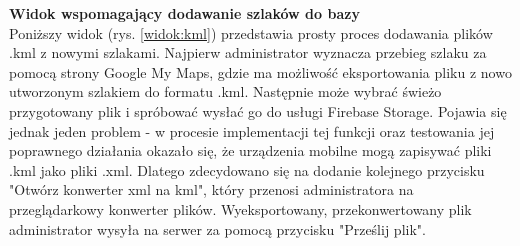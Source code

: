 \textbf{Widok wspomagający dodawanie szlaków do bazy} \\ 
\indent Poniższy widok (rys. \ref{widok:kml}) przedstawia prosty proces dodawania plików .kml z nowymi szlakami. Najpierw administrator wyznacza przebieg szlaku za pomocą strony Google My Maps, gdzie ma możliwość eksportowania pliku z nowo utworzonym szlakiem do formatu .kml. Następnie może wybrać świeżo przygotowany plik i spróbować wysłać go do usługi Firebase Storage. Pojawia się jednak jeden problem - w procesie implementacji tej funkcji oraz testowania jej poprawnego działania okazało się, że urządzenia mobilne mogą zapisywać pliki .kml jako pliki .xml. Dlatego zdecydowano się na dodanie kolejnego przycisku "Otwórz konwerter xml na kml", który przenosi administratora na przeglądarkowy konwerter plików. Wyeksportowany, przekonwertowany plik administrator wysyła na serwer za pomocą przycisku "Prześlij plik".
